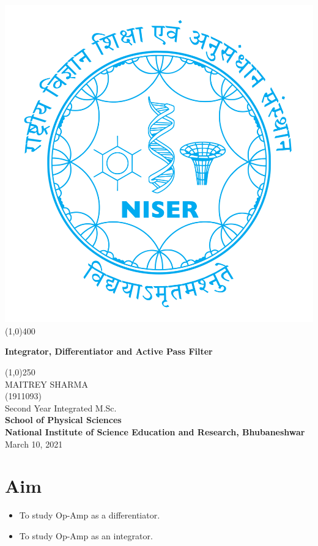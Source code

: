 \begin{titlepage}
\begin{center}
\includegraphics[scale=0.15]{Documents/niser.png}
\line(1,0){400}\\
[2mm]
\begin{large}
\textbf{\huge Integrator, Differentiator and Active Pass Filter}\\ 
\end{large}
\line(1,0){250}\\
[5cm]
\large MAITREY SHARMA\\
\small (1911093)\\
[4.5cm]
Second Year Integrated M.Sc.\\
\textbf{School of Physical Sciences}\\
\textbf{National Institute of Science Education and Research, Bhubaneshwar}\\
\small March 10, 2021
\end{center} 
\end{titlepage}
\newpage
\section{Aim}
\begin{itemize}
    \item To study Op-Amp as a differentiator.
    \item To study Op-Amp as an integrator.
\end{itemize}
